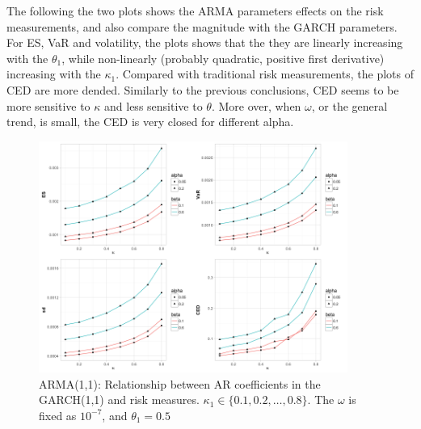 \documentclass[11pt]{article}
\begin{document}
The following the two plots shows the ARMA parameters effects on the risk measurements, and also compare the magnitude with the GARCH parameters. For ES, VaR and volatility, the plots shows that the they are linearly increasing with the $\theta_1$, while non-linearly (probably quadratic, positive first derivative) increasing with the $\kappa_1$. Compared with traditional risk measurements, the plots of CED are more dended. Similarly to the previous conclusions, CED seems to be more sensitive to $\kappa$ and less sensitive to $\theta$. More over, when $\omega$, or the general trend, is small, the CED is very closed for different alpha.

\begin{figure}[H]
\centering
\includegraphics[width = 0.9\textwidth]{../figures/simulation_garch/garch_ARMA11_risk_measures_ar1}
\caption{ARMA(1,1): Relationship between AR coefficients in the GARCH(1,1) and risk measures. $\kappa_1 \in \{0.1,0.2, \dots, 0.8 \}$. The $\omega$  is fixed as $10^{-7}$, and $\theta_1 = 0.5$}
\label{fig:garch_rm_coef_ar}
\end{figure}
\end{document}
